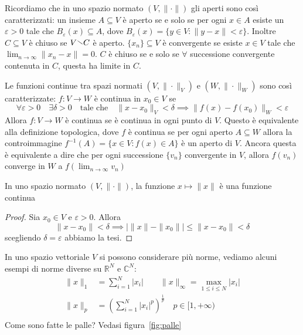 Ricordiamo che in uno spazio normato \((V, \|\cdot \|)\) gli aperti sono così
caratterizzati: un insieme \(A \subseteq V\) è aperto se e solo se per ogni \(x
\in A\) esiste un \(\varepsilon > 0\) tale che \(B_\varepsilon(x) \subseteq
A\), dove \(B_\varepsilon(x) = \{y \in V : \|y - x\| < \varepsilon\}\). Inoltre
\(C \subseteq V \) è chiuso se \(V \sminus C\) è aperto. \(\{x_{n}\} \subseteq V
\) è convergente se esiste \(x \in V\) tale che \(\lim_{n \to \infty} \|x_{n} -
x\| = 0\). \(C\) è chiuso se e solo se \(\forall \) successione convergente
contenuta in \(C\), questa ha limite in \(C\).

Le funzioni continue tra spazi normati \((V, \|\cdot \|_V)\) e \((W, \|\cdot
\|_W)\)  sono così caratterizzate: \(f : V \to W \) è continua in \(x_{0} \in
V\) se
\[
    \forall \varepsilon > 0 \quad \exists \delta > 0 \quad \text{tale che} \quad
    \|x - x_{0}\|_V < \delta \implies \|f(x) - f(x_{0})\|_W < \varepsilon
\]
Allora \(f : V \to W\) è continua se è continua in ogni punto di \(V\).
Questo è equivalente alla definizione topologica, dove \(f\) è continua se per
ogni aperto \(A \subseteq W \) allora la controimmagine \(f ^{-1}(A)  = \{x \in
V : f(x) \in A\} \) è un aperto di \(V\). Ancora questa è equivalente a dire che
per ogni successione \(\{v_{n}\} \) convergente in \(V\), allora
\(f(v_{n})\) converge in \(W\) a \(f(\lim_{n \to \infty} v_{n})\) 
\begin{proposition}
    In uno spazio normato \((V, \|\cdot \|)\), la funzione \(x \mapsto \|x\|\) è
    una funzione continua
\end{proposition}
\begin{proof}
    Sia \(x_{0} \in V\) e \(\varepsilon > 0\). Allora
    \[
        \|x - x_{0}\| < \delta \implies |\|x\| - \|x_{0}\| | \le \|x - x_{0}\| <
        \delta
    \]
    scegliendo \(\delta = \varepsilon\) abbiamo la tesi.
\end{proof}
In uno spazio vettoriale \(V\) si possono considerare più norme, vediamo alcuni
esempi di norme diverse su \(\mathbb{R}^{N}\) e \(\mathbb{C}^{N}\):
\begin{align*}
    \|x\|_{1} &= \sum_{i=1}^{N} |x_i| \quad \quad
    \|x\|_{\infty} = \max_{1 \le i \le N} |x_i| \\
    \|x\|_{p} &= {\left( \sum_{i=1}^{N} |x_{i}|^{p}  \right)}^{\frac{1}{p}}
    \quad p \in [1, +\infty) \\
\end{align*}
Come sono fatte le palle? Vedasi figura~\ref{fig:palle}
